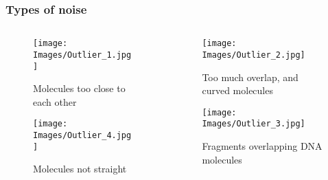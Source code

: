 \documentclass[10pt,dvipsnames,table]{beamer}
\begin{document}
\begin{frame}
\frametitle{Types of noise}
\begin{columns}[t]
\begin{column}{0.6\textwidth}
\begin{figure}[H]
\begin{center}
\texttt{[image: Images/Outlier\_1.jpg]}
\end{center}
\caption{Molecules too close to each other}
\end{figure}

\begin{figure}[H]
\begin{center}
\texttt{[image: Images/Outlier\_4.jpg]}
\end{center}
\caption{Molecules not straight}
\end{figure}

\end{column}
\begin{column}{0.4\textwidth}
\begin{figure}[H]
\begin{center}
\texttt{[image: Images/Outlier\_2.jpg]}
\end{center}
\caption{Too much overlap, and curved molecules}
\end{figure}

\begin{figure}[H]
\begin{center}
\texttt{[image: Images/Outlier\_3.jpg]}
\end{center}
\caption{Fragments overlapping DNA molecules}
\end{figure}
\end{column}

\end{columns}
\end{frame}
\end{document}
